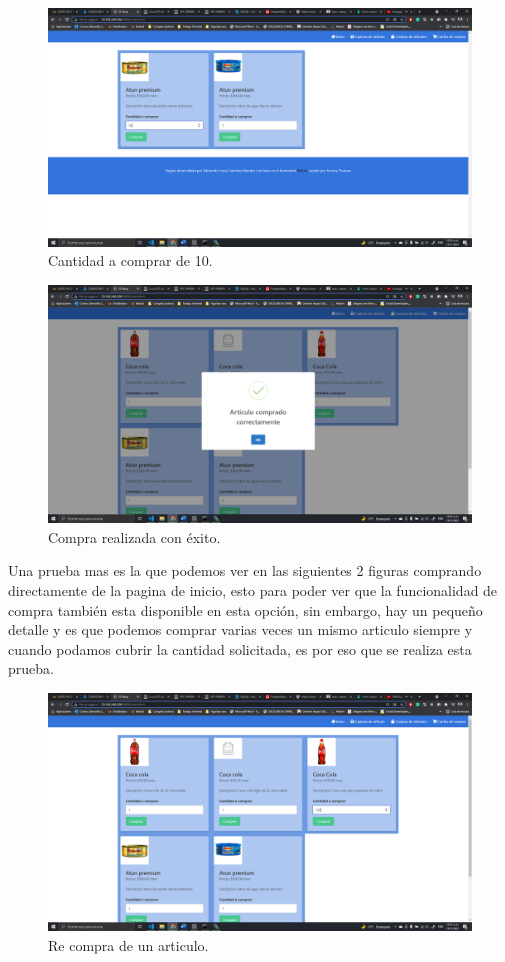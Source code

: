 \documentclass[11pt]{article}
\begin{document}
		\begin{figure}[H]
			\centering
			\includegraphics[scale=0.34]{resources/p3.3.png}
			\caption{Cantidad a comprar de 10.}\label{fig:picture}
		\end{figure}
		\begin{figure}[H]
			\centering
			\includegraphics[scale=0.34]{resources/p3.4.png}
			\caption{Compra realizada con éxito.}\label{fig:picture}
		\end{figure}
		Una prueba mas es la que podemos ver en las siguientes 2 figuras comprando directamente de la pagina de inicio, esto para poder ver que la funcionalidad de compra también esta disponible en esta opción, sin embargo, hay un pequeño detalle y es que podemos comprar varias veces un mismo articulo siempre y cuando podamos cubrir la cantidad solicitada, es por eso que se realiza esta prueba.
		\begin{figure}[H]
			\centering
			\includegraphics[scale=0.34]{resources/p3.6_recompra.png}
			\caption{Re compra de un articulo.}\label{fig:picture}
		\end{figure}
\end{document}

